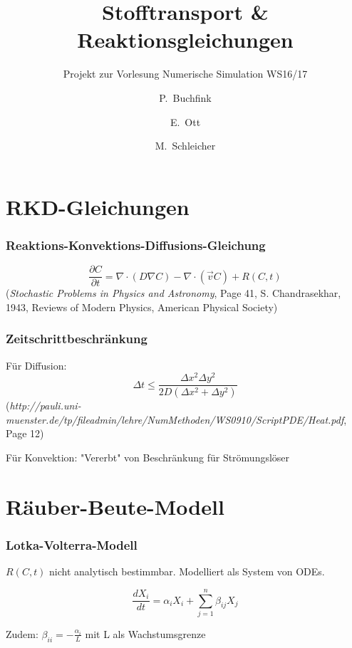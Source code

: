 \documentclass[12pt]{beamer}
\title{Stofftransport \& Reaktionsgleichungen}
\subtitle{Projekt zur Vorlesung Numerische Simulation WS16/17}
\author{P.~Buchfink\inst{1} \and E.~Ott\inst{1} \and M.~Schleicher\inst{1}}
\institute
{
  \inst{1}
  Institut \\
  Universität Stuttgart
}
\begin{document}
  \begin{frame}
    \titlepage
  \end{frame}

  \section{RKD-Gleichungen}
    \begin{frame}
      \frametitle{Reaktions-Konvektions-Diffusions-Gleichung}
      $$\frac{\partial C}{\partial t} = \nabla \cdot (D \nabla C) - \nabla \cdot (\vec{v} C) + R(C,t)$$
      {\tiny (\emph{Stochastic Problems in Physics and Astronomy}, Page 41, S. Chandrasekhar, 1943, Reviews of Modern Physics, American Physical Society)}
    \end{frame}

    \begin{frame}
      \frametitle{Zeitschrittbeschränkung}
      Für Diffusion:
      $$\Delta t \leq \frac{\Delta x^2 \Delta y^2}{2D(\Delta x^2 + \Delta y^2)}$$
      {\tiny (\emph{http://pauli.uni-muenster.de/tp/fileadmin/lehre/NumMethoden/WS0910/ScriptPDE/Heat.pdf}, Page 12)}
      
      Für Konvektion: "Vererbt" von Beschränkung für Strömungslöser
    \end{frame}

  \section{Räuber-Beute-Modell}
    \begin{frame}
    \frametitle{Lotka-Volterra-Modell}
    $R(C,t)$ nicht analytisch bestimmbar. Modelliert als System von ODEs.
    
    $$\frac{dX_i}{dt} = \alpha_i X_i + \sum_{j=1}^{n} \beta_{ij} X_j$$
    
    Zudem: $\beta_{ii} = -\frac{\alpha_i}{L}$ mit L als Wachstumsgrenze
    \end{frame}
\end{document}
